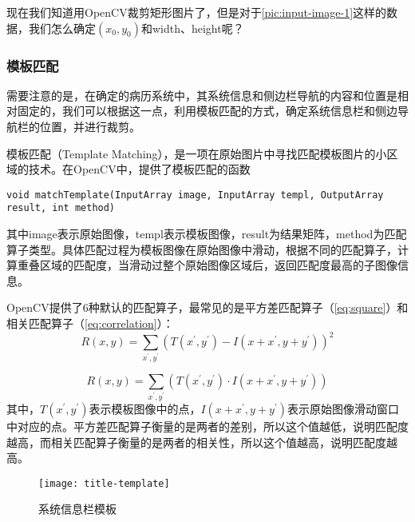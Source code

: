现在我们知道用OpenCV裁剪矩形图片了，但是对于\autoref{pic:input-image-1}这样的数据，我们怎么确定$(x_0,y_0)$和width、height呢？

\subsubsection*{模板匹配}
需要注意的是，在确定的病历系统中，其系统信息和侧边栏导航的内容和位置是相对固定的，我们可以根据这一点，利用模板匹配的方式，确定系统信息栏和侧边导航栏的位置，并进行裁剪。

模板匹配（Template Matching）\citep{template-matching}，是一项在原始图片中寻找匹配模板图片的小区域的技术。在OpenCV中，提供了模板匹配的函数
\begin{lstlisting}
void matchTemplate(InputArray image, InputArray templ, OutputArray result, int method)
\end{lstlisting}
其中image表示原始图像，templ表示模板图像，result为结果矩阵，method为匹配算子类型。具体匹配过程为模板图像在原始图像中滑动，根据不同的匹配算子，计算重叠区域的匹配度，当滑动过整个原始图像区域后，返回匹配度最高的子图像信息。

OpenCV提供了6种默认的匹配算子，最常见的是平方差匹配算子（\autoref{eq:square}）和相关匹配算子（\autoref{eq:correlation}）：
\begin{equation} \label{eq:square}
R(x,y)=\sum_{x^{'},y^{'}}(T(x^{'},y^{'})-I(x+x^{'},y+y^{'}))^2
\end{equation}

\begin{equation} \label{eq:correlation}
R(x,y)=\sum_{x^{'},y^{'}}(T(x^{'},y^{'})\cdot I(x+x^{'},y+y^{'}))
\end{equation}
其中，$T(x^{'},y^{'})$表示模板图像中的点，$I(x+x^{'},y+y^{'})$表示原始图像滑动窗口中对应的点。平方差匹配算子衡量的是两者的差别，所以这个值越低，说明匹配度越高，而相关匹配算子衡量的是两者的相关性，所以这个值越高，说明匹配度越高。

\begin{figure}
	\centering
	\texttt{[image: title-template]}
	\caption{系统信息栏模板}
	\label{pic:title-template}
\end{figure}

